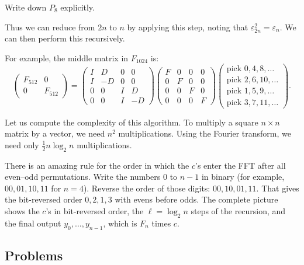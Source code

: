 \begin{exercise}
Write down $P_{8}$ explicitly.
\end{exercise}

Thus we can reduce from $2n$ to $n$ by applying this step, noting that $\varepsilon_{2n}^2 = \varepsilon_n$. We can then perform this recursively.

For example, the middle matrix in $F_{1024}$ is:
$$
\begin{pmatrix}
F_{512} & 0 \\
0 & F_{512}
\end{pmatrix}
=
\begin{pmatrix}
I & D & 0 & 0 \\
I & -D & 0 & 0 \\
0 & 0 & I & D \\
0 & 0 & I & -D
\end{pmatrix}
\begin{pmatrix}
F & 0 & 0 & 0 \\
0 & F & 0 & 0 \\
0 & 0 & F & 0 \\
0 & 0 & 0 & F
\end{pmatrix}
\begin{pmatrix}
\text{pick } 0,4,8,\ldots \\
\text{pick } 2,6,10,\ldots \\
\text{pick } 1,5,9,\ldots \\
\text{pick } 3,7,11,\ldots
\end{pmatrix}.
$$

Let us compute the complexity of this algorithm. To multiply a square $n\times n$ matrix by a vector, we need $n^2$ multiplications. Using the Fourier transform, we need only $\frac{1}{2} n \log_2 n$ multiplications.

\begin{exercise}
There is an amazing rule for the order in which the $c$'s enter the FFT after all even–odd permutations. Write the numbers $0$ to $n-1$ in binary (for example, $00, 01, 10, 11$ for $n=4$). Reverse the order of those digits: $00, 10, 01, 11$. That gives the bit-reversed order $0, 2, 1, 3$ with evens before odds. The complete picture shows the $c$'s in bit-reversed order, the $\ell=\log_2 n$ steps of the recursion, and the final output $y_0, \ldots, y_{n-1}$, which is $F_n$ times $c$.
\end{exercise}

\subsection{Problems}

